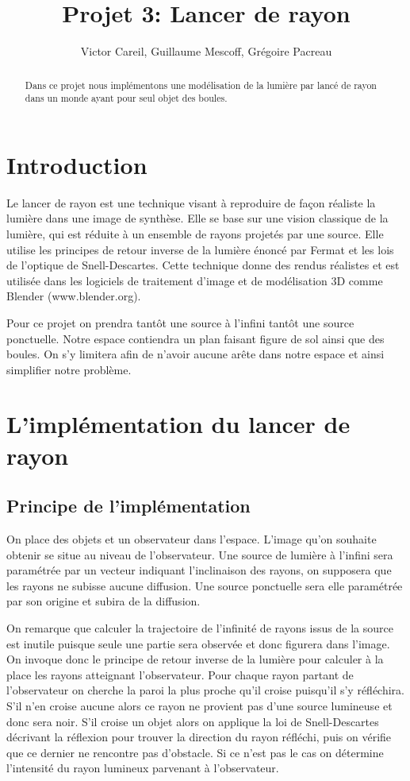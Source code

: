 \documentclass[11pt,a4paper]{article}
\author{Victor Careil, Guillaume Mescoff, Grégoire Pacreau}
\title{Projet 3: Lancer de rayon}
\begin{document}
\maketitle

\begin{abstract}

Dans ce projet nous implémentons une modélisation de la lumière par lancé de rayon dans un monde ayant pour seul objet des boules.

\end{abstract}

\section*{Introduction}

Le lancer de rayon est une technique visant à reproduire de façon réaliste la lumière dans une image de synthèse. Elle se base sur une vision classique de la lumière, qui est réduite à un ensemble de rayons projetés par une source. Elle utilise les principes de retour inverse de la lumière énoncé par Fermat et les lois de l'optique de Snell-Descartes. Cette technique donne des rendus réalistes et est utilisée dans les logiciels de traitement d'image et de modélisation 3D comme Blender (www.blender.org).

Pour ce projet on prendra tantôt une source à l'infini tantôt une source ponctuelle. Notre espace contiendra un plan faisant figure de sol ainsi que des boules. On s'y limitera afin de n'avoir aucune arête dans notre espace et ainsi simplifier notre problème.

\section{L'implémentation du lancer de rayon}

\subsection{Principe de l'implémentation}

On place des objets et un observateur dans l'espace. L'image qu'on souhaite obtenir se situe au niveau de l'observateur. Une source de lumière à l'infini sera paramétrée par un vecteur indiquant l'inclinaison des rayons, on supposera que les rayons ne subisse aucune diffusion. Une source ponctuelle sera elle paramétrée par son origine et subira de la diffusion.

On remarque que calculer la trajectoire de l'infinité de rayons issus de la source est inutile puisque seule une partie sera observée et donc figurera dans l'image. On invoque donc le principe de retour inverse de la lumière pour calculer à la place les rayons atteignant l'observateur. Pour chaque rayon partant de l'observateur on cherche la paroi la plus proche qu'il croise puisqu'il s'y réfléchira. S'il n'en croise aucune alors ce rayon ne provient pas d'une source lumineuse et donc sera noir. S'il croise un objet alors on applique la loi de Snell-Descartes décrivant la réflexion pour trouver la direction du rayon réfléchi, puis on vérifie que ce dernier ne rencontre pas d'obstacle. Si ce n'est pas le cas on détermine l'intensité du rayon lumineux parvenant à l'observateur.
\end{document}
